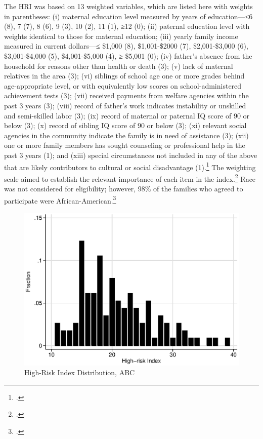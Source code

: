 \begin{appendices}
\noindent The HRI was based on 13 weighted variables, which are listed here with weights in parentheses: (i) maternal education level measured by years of education---≤6 (8), 7 (7), 8 (6), 9 (3), 10 (2), 11 (1), ≥12 (0); (ii) paternal education level with weights identical to those for maternal education; (iii) yearly family income measured in current dollars---≤ \$1,000 (8), \$1,001-\$2000 (7), \$2,001-\$3,000 (6), \$3,001-\$4,000 (5), \$4,001-\$5,000 (4), ≥ \$5,001 (0); (iv) father's absence from the household for reasons other than health or death (3); (v) lack of maternal relatives in the area (3); (vi) siblings of school age one or more grades behind age-appropriate level, or with equivalently low scores on school-administered achievement tests (3); (vii) received payments from welfare agencies within the past 3 years (3); (viii) record of father's work indicates instability or unskilled and semi-skilled labor (3); (ix) record of maternal or paternal IQ score of 90 or below (3); (x) record of sibling IQ score of 90 or below (3); (xi) relevant social agencies in the community indicate the family is in need of assistance (3); (xii) one or more family members has sought counseling or professional help in the past 3 years (1); and (xiii) special circumstances not included in any of the above that are likely contributors to cultural or social disadvantage (1).\footnote{\citet{Ramey_Smith_1977_AJMD, Ramey_Campbell_1984_AJMD,Ramey_Campbell_1991_childreninpoverty,Ramey_Campbell_etal_2000_ADS}.} The weighting scale aimed to establish the relevant importance of each item in the index.\footnote{\citet{Ramey_Smith_1977_AJMD}.} Race was not  considered for eligibility; however, 98\% of the families who agreed to participate were African-American.\footnote{\citet{Ramey_Smith_1977_AJMD,Ramey_Campbell_1979_SR}.} \\

\begin{center}
	\begin{figure}[H]
		\caption{High-Risk Index Distribution, ABC} \label{figure:hridistabc}
		\centering
		\includegraphics[width=.9\columnwidth]{output/abc_hri.eps}
	\end{figure}
\end{center}


\end{appendices}
